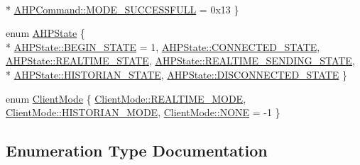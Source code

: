 \begin{DoxyCompactItemize}
\\*
\hyperlink{namespace_a_h_p_ac6dabdee20c9d5b492f2578a36e04f51a9b43b2a1c009ff7f1383ed26477f269e}{A\+H\+P\+Command\+::\+M\+O\+D\+E\+\_\+\+S\+U\+C\+C\+E\+S\+S\+F\+U\+L\+L} = 0x13
 \}
\item 
enum \hyperlink{namespace_a_h_p_ac9ee6096543f42ba98e4903030b617d6}{A\+H\+P\+State} \{ \\*
\hyperlink{namespace_a_h_p_ac9ee6096543f42ba98e4903030b617d6a1c71f87a40afd7f9fa3956e7de73f4e1}{A\+H\+P\+State\+::\+B\+E\+G\+I\+N\+\_\+\+S\+T\+A\+T\+E} = 1, 
\hyperlink{namespace_a_h_p_ac9ee6096543f42ba98e4903030b617d6a07e6a8060624aff3e4001b7cafaeae0c}{A\+H\+P\+State\+::\+C\+O\+N\+N\+E\+C\+T\+E\+D\+\_\+\+S\+T\+A\+T\+E}, 
\hyperlink{namespace_a_h_p_ac9ee6096543f42ba98e4903030b617d6ae10626b693c7552b39d3ba1d9724a8fb}{A\+H\+P\+State\+::\+R\+E\+A\+L\+T\+I\+M\+E\+\_\+\+S\+T\+A\+T\+E}, 
\hyperlink{namespace_a_h_p_ac9ee6096543f42ba98e4903030b617d6a0953f17fc420ab7f8836450dbf6344e9}{A\+H\+P\+State\+::\+R\+E\+A\+L\+T\+I\+M\+E\+\_\+\+S\+E\+N\+D\+I\+N\+G\+\_\+\+S\+T\+A\+T\+E}, 
\\*
\hyperlink{namespace_a_h_p_ac9ee6096543f42ba98e4903030b617d6a0d36a97f23d8d89848b16b7f1d39236d}{A\+H\+P\+State\+::\+H\+I\+S\+T\+O\+R\+I\+A\+N\+\_\+\+S\+T\+A\+T\+E}, 
\hyperlink{namespace_a_h_p_ac9ee6096543f42ba98e4903030b617d6ac172f5eba6db6c9390c323a34a7b739c}{A\+H\+P\+State\+::\+D\+I\+S\+C\+O\+N\+N\+E\+C\+T\+E\+D\+\_\+\+S\+T\+A\+T\+E}
 \}
\item 
enum \hyperlink{namespace_a_h_p_a130fcb3fee4e9ea58cc099ea76b62884}{Client\+Mode} \{ \hyperlink{namespace_a_h_p_a130fcb3fee4e9ea58cc099ea76b62884a5099f5e25da27cf38bda672f35f133e7}{Client\+Mode\+::\+R\+E\+A\+L\+T\+I\+M\+E\+\_\+\+M\+O\+D\+E}, 
\hyperlink{namespace_a_h_p_a130fcb3fee4e9ea58cc099ea76b62884ab8e94665ef7a861feb115de00d6b9b24}{Client\+Mode\+::\+H\+I\+S\+T\+O\+R\+I\+A\+N\+\_\+\+M\+O\+D\+E}, 
\hyperlink{namespace_a_h_p_a130fcb3fee4e9ea58cc099ea76b62884ab50339a10e1de285ac99d4c3990b8693}{Client\+Mode\+::\+N\+O\+N\+E} = -\/1
 \}
\end{DoxyCompactItemize}


\subsection{Enumeration Type Documentation}
\hypertarget{namespace_a_h_p_ac6dabdee20c9d5b492f2578a36e04f51}{}
